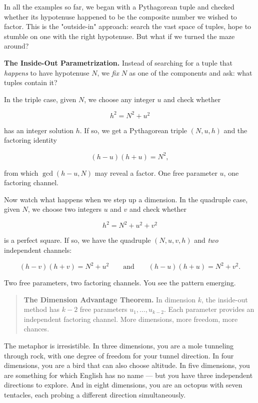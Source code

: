 \documentclass[12pt, letterpaper, openany]{book}
\theoremstyle{definition}
\theoremstyle{remark}
\begin{document}
In all the examples so far, we began with a Pythagorean tuple and checked whether its hypotenuse happened to be the composite number we wished to factor. This is the "outside-in" approach: search the vast space of tuples, hope to stumble on one with the right hypotenuse. But what if we turned the maze around?

\textbf{The Inside-Out Parametrization.} Instead of searching for a tuple that \textit{happens} to have hypotenuse $N$, we \textit{fix} $N$ as one of the components and ask: what tuples contain it?

In the triple case, given $N$, we choose any integer $u$ and check whether

\[
h^2 = N^2 + u^2
\]

has an integer solution $h$. If so, we get a Pythagorean triple $(N, u, h)$ and the factoring identity

\[
(h - u)(h + u) = N^2,
\]

from which $\gcd(h - u, N)$ may reveal a factor. One free parameter $u$, one factoring channel.

Now watch what happens when we step up a dimension. In the quadruple case, given $N$, we choose two integers $u$ and $v$ and check whether

\[
h^2 = N^2 + u^2 + v^2
\]

is a perfect square. If so, we have the quadruple $(N, u, v, h)$ and \textit{two} independent channels:

\[
(h - v)(h + v) = N^2 + u^2 \qquad \text{and} \qquad (h - u)(h + u) = N^2 + v^2.
\]

Two free parameters, two factoring channels. You see the pattern emerging.


\begin{quote}
\textbf{The Dimension Advantage Theorem.} In dimension $k$, the inside-out method has $k - 2$ free parameters $u_1, \ldots, u_{k-2}$. Each parameter provides an independent factoring channel. More dimensions, more freedom, more chances.
\end{quote}


The metaphor is irresistible. In three dimensions, you are a mole tunneling through rock, with one degree of freedom for your tunnel direction. In four dimensions, you are a bird that can also choose altitude. In five dimensions, you are something for which English has no name --- but you have three independent directions to explore. And in eight dimensions, you are an octopus with seven tentacles, each probing a different direction simultaneously.
\end{document}
